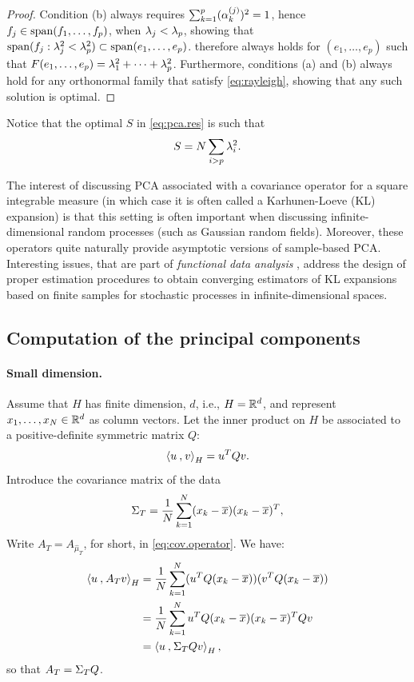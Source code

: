 \begin{proof}
Condition (b) always requires  $\sum_{k=1}^p (\alpha_{k}^{(j)})^2 = 1$, hence $f_j\in \mathrm{span}(f_1, \ldots, f_p)$, when $\lambda_j < \lambda_p$, showing that $\mathrm{span}(f_j: \lambda^2_j<\lambda^2_p) \subset \mathrm{span}(e_1, \ldots,
e_p)$.  therefore always holds for $(e_1, \ldots, e_p)$ such that $F(e_1, \ldots, e_p) = \lambda^2_1 +\cdots +\lambda^2_p$. Furthermore, conditions (a) and (b) always hold for any orthonormal family that satisfy \cref{eq:rayleigh}, showing that any such solution is optimal.
\end{proof}

Notice that the optimal  $S$ in \cref{eq:pca.res} is such that
$$
S = N\sum_{i>p}\lambda^2_i.
$$ 

\begin{remark}
The interest of discussing PCA associated with a covariance operator for a square integrable measure (in which case it is often called a Karhunen-Loeve (KL) expansion) is that this setting is often important when discussing infinite-dimensional random processes (such as Gaussian random fields). Moreover, these operators quite naturally provide asymptotic versions of sample-based PCA. Interesting issues, that are part of {\em functional data analysis} \citep{rs97}, address the design of proper estimation procedures to obtain converging estimators of KL expansions based on finite samples for stochastic processes in infinite-dimensional spaces.
\end{remark}

\subsection{Computation of the principal components}
\label{sec:pca.comp}
\paragraph{Small dimension.}
Assume that $H$ has finite dimension, $d$, i.e.,  $H= {\mathbb{R}}^d$, and represent $x_1, \ldots,
x_N\in {\mathbb{R}}^d$ as
column vectors. Let the inner product on $H$ be associated
to a positive-definite symmetric matrix $Q$:
\[
{\langle {u}\mathbin{,} {v}\rangle}_H = u^T Q v.
\]  
Introduce the covariance matrix of the data
\[
\Sigma_T = \frac{1}{N} \sum_{k=1}^N (x_k - \overline{x})(x_k-\overline{x})^T,
\]
Write $A_T = A_{\hat \mu_T}$, for short,  in \cref{eq:cov.operator}. We have:
\begin{align*}
{\langle {u}\mathbin{,} {A_T v}\rangle}_H & = \frac1N \sum_{k=1}^N (u^TQ(x_k-\overline{x}))(v^TQ(x_k-\overline{x}))\\
&= \frac1N \sum_{k=1}^N u^TQ(x_k-\overline{x})(x_k-\overline{x})^TQv\\
&= {\langle {u}\mathbin{,} {\Sigma_T Qv}\rangle}_H\,,
\end{align*}
so that $A_T = \Sigma_T Q$.





